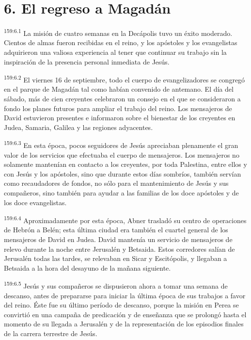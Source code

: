 \section*{6. El regreso a Magadán}
\par
\textsuperscript{159:6.1} La misión de cuatro semanas en la Decápolis tuvo un éxito moderado. Cientos de almas fueron recibidas en el reino, y los apóstoles y los evangelistas adquirieron una valiosa experiencia al tener que continuar su trabajo sin la inspiración de la presencia personal inmediata de Jesús.

\par
\textsuperscript{159:6.2} El viernes 16 de septiembre, todo el cuerpo de evangelizadores se congregó en el parque de Magadán tal como habían convenido de antemano. El día del sábado, más de cien creyentes celebraron un consejo en el que se consideraron a fondo los planes futuros para ampliar el trabajo del reino. Los mensajeros de David estuvieron presentes e informaron sobre el bienestar de los creyentes en Judea, Samaria, Galilea y las regiones adyacentes.

\par
\textsuperscript{159:6.3} En esta época, pocos seguidores de Jesús apreciaban plenamente el gran valor de los servicios que efectuaba el cuerpo de mensajeros. Los mensajeros no solamente mantenían en contacto a los creyentes, por toda Palestina, entre ellos y con Jesús y los apóstoles, sino que durante estos días sombríos, también servían como recaudadores de fondos, no sólo para el mantenimiento de Jesús y sus compañeros, sino también para ayudar a las familias de los doce apóstoles y de los doce evangelistas.

\par
\textsuperscript{159:6.4} Aproximadamente por esta época, Abner trasladó su centro de operaciones de Hebrón a Belén; esta última ciudad era también el cuartel general de los mensajeros de David en Judea. David mantenía un servicio de mensajeros de relevo durante la noche entre Jerusalén y Betsaida. Estos corredores salían de Jerusalén todas las tardes, se relevaban en Sicar y Escitópolis, y llegaban a Betsaida a la hora del desayuno de la mañana siguiente.

\par
\textsuperscript{159:6.5} Jesús y sus compañeros se dispusieron ahora a tomar una semana de descanso, antes de prepararse para iniciar la última época de sus trabajos a favor del reino. Éste fue su último período de descanso, porque la misión en Perea se convirtió en una campaña de predicación y de enseñanza que se prolongó hasta el momento de su llegada a Jerusalén y de la representación de los episodios finales de la carrera terrestre de Jesús.